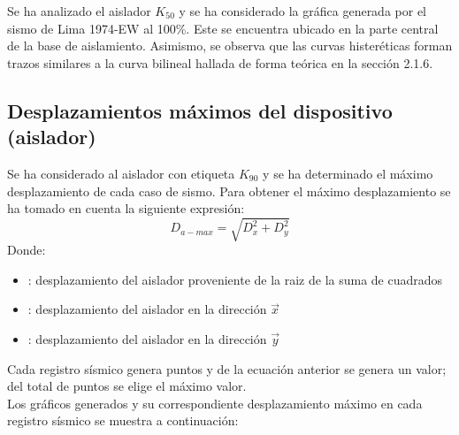 Se ha analizado el aislador $K_{50}$ y se ha considerado la gráfica generada por el sismo de Lima 1974-EW al 100\%. Este se encuentra ubicado en la parte central de la base de aislamiento. Asimismo, se observa que las curvas histeréticas forman trazos similares a la curva bilineal hallada de forma teórica en la sección 2.1.6.

\subsection{Desplazamientos máximos del dispositivo (aislador)}

Se ha considerado al aislador con etiqueta $K_{90}$ y se ha determinado el máximo desplazamiento de cada caso de sismo. Para obtener el máximo desplazamiento se ha tomado en cuenta la siguiente expresión:
\begin{equation}
    D_{a-max} = \sqrt{D_x^2 + D_y^2} \label{eq4_1}
\end{equation}
Donde:
\begin{itemize}
    \item{}: desplazamiento del aislador proveniente de la raiz de la suma de cuadrados
    \item{}: desplazamiento del aislador en la dirección $\vec{x}$
    \item{}: desplazamiento del aislador en la dirección $\vec{y}$
\end{itemize}

Cada registro sísmico genera puntos y de la ecuación anterior se genera un valor; del total de puntos se elige el máximo valor.\\

Los gráficos generados y su correspondiente desplazamiento máximo en cada registro sísmico se muestra a continuación:

